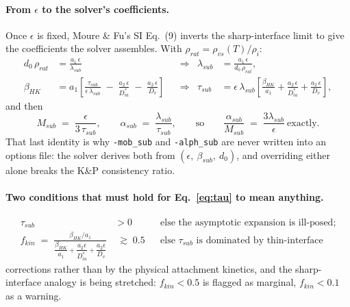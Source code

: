 %

\paragraph{From $\epsilon$ to the solver's coefficients.}
Once $\epsilon$ is fixed, Moure \& Fu's SI Eq.~(9) inverts the
sharp-interface limit to give the coefficients the solver assembles. With
$\rho_{rat} = \rho_{vs}(T)/\rho_i$:
%
\begin{align}
  d_0\,\rho_{rat} &= \frac{a_1\,\epsilon}{\lambda_{sub}}
  &&\Longrightarrow&
  \lambda_{sub} &= \frac{a_1\,\epsilon}{d_0\,\rho_{rat}}, \label{eq:lam}\\[4pt]
  \beta_{HK} &= a_1\left[\frac{\tau_{sub}}{\epsilon\,\lambda_{sub}}
     \;-\; \frac{a_2\,\epsilon}{D^{*}_{ia}}
     \;-\; \frac{a_2\,\epsilon}{D_v}\right]
  &&\Longrightarrow&
  \tau_{sub} &= \epsilon\,\lambda_{sub}\left[
     \frac{\beta_{HK}}{a_1}
     + \frac{a_2\,\epsilon}{D^{*}_{ia}}
     + \frac{a_2\,\epsilon}{D_v}\right], \label{eq:tau}
\end{align}
%
and then
%
\begin{equation}
  M_{sub} \;=\; \frac{\epsilon}{3\,\tau_{sub}},
  \qquad
  \alpha_{sub} \;=\; \frac{\lambda_{sub}}{\tau_{sub}},
  \qquad\text{so}\qquad
  \frac{\alpha_{sub}}{M_{sub}} \;=\; \frac{3\lambda_{sub}}{\epsilon}
  \ \text{exactly.}
  \label{eq:Msub}
\end{equation}
%
That last identity is why \texttt{-mob\_sub} and \texttt{-alph\_sub} are
never written into an options file: the solver derives both from
$(\epsilon,\ \beta_{sub},\ d_0)$, and overriding either alone breaks the
K\&P consistency ratio.

\paragraph{Two conditions that must hold for Eq.~\eqref{eq:tau} to mean
anything.}
\begin{align}
  \tau_{sub} &> 0
  &&\text{else the asymptotic expansion is ill-posed;} \label{eq:tauplus}\\[2pt]
  f_{kin} \;=\; \frac{\beta_{HK}/a_1}
       {\dfrac{\beta_{HK}}{a_1}
        + \dfrac{a_2\epsilon}{D^{*}_{ia}}
        + \dfrac{a_2\epsilon}{D_v}} &\;\gtrsim\; 0.5
  &&\text{else $\tau_{sub}$ is dominated by thin-interface}
  \label{eq:fkin}
\end{align}
%
corrections rather than by the physical attachment kinetics, and the
sharp-interface analogy is being stretched: $f_{kin} < 0.5$ is flagged as
marginal, $f_{kin} < 0.1$ as a warning.

